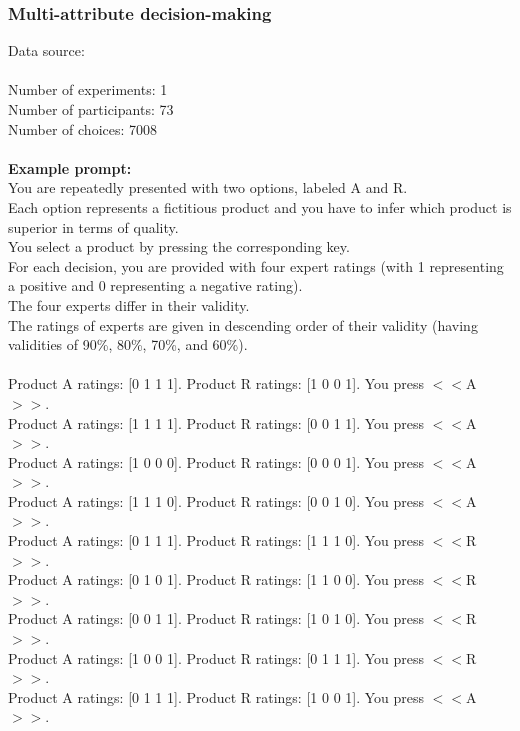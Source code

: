 \documentclass[pdflatex,sn-nature]{sn-jnl}%
\theoremstyle{thmstyleone}%
\theoremstyle{thmstyletwo}%
\theoremstyle{thmstylethree}%
\begin{document}
\subsubsection*{Multi-attribute decision-making}
Data source: \cite{hilbig2014generalized} \\ $~$ \\
Number of experiments: 1 $~$\\ 
Number of participants: 73 $~$\\ 
Number of choices: 7008 $~$\\ 
 $~$\\ 
\textbf{Example prompt:}
 $~$\\ 
You are repeatedly presented with two options, labeled A and R. $~$\\ 
Each option represents a fictitious product and you have to infer which product is superior in terms of quality. $~$\\ 
You select a product by pressing the corresponding key. $~$\\ 
For each decision, you are provided with four expert ratings (with 1 representing a positive and 0 representing a negative rating). $~$\\ 
The four experts differ in their validity. $~$\\ 
The ratings of experts are given in descending order of their validity (having validities of 90\%, 80\%, 70\%, and 60\%). $~$\\ 
 $~$\\ 
Product A ratings: [0 1 1 1]. Product R ratings: [1 0 0 1]. You press $<<$A$>>$. $~$\\ 
Product A ratings: [1 1 1 1]. Product R ratings: [0 0 1 1]. You press $<<$A$>>$. $~$\\ 
Product A ratings: [1 0 0 0]. Product R ratings: [0 0 0 1]. You press $<<$A$>>$. $~$\\ 
Product A ratings: [1 1 1 0]. Product R ratings: [0 0 1 0]. You press $<<$A$>>$. $~$\\ 
Product A ratings: [0 1 1 1]. Product R ratings: [1 1 1 0]. You press $<<$R$>>$. $~$\\ 
Product A ratings: [0 1 0 1]. Product R ratings: [1 1 0 0]. You press $<<$R$>>$. $~$\\ 
Product A ratings: [0 0 1 1]. Product R ratings: [1 0 1 0]. You press $<<$R$>>$. $~$\\ 
Product A ratings: [1 0 0 1]. Product R ratings: [0 1 1 1]. You press $<<$R$>>$. $~$\\ 
Product A ratings: [0 1 1 1]. Product R ratings: [1 0 0 1]. You press $<<$A$>>$. $~$\\ 
\end{document}
